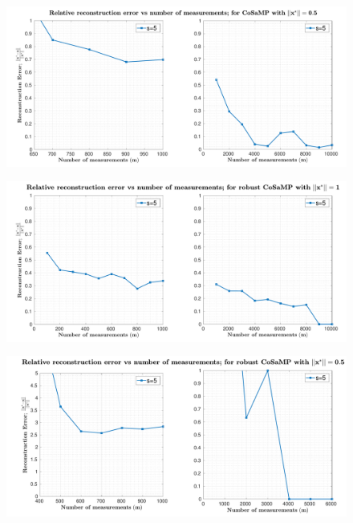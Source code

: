 \begin{figure}[t]
	\begin{center}
		\includegraphics[width=\linewidth]{./fig/plot-1-2.pdf}
	\end{center}
	\caption{}
	\label{fig:plot-1-2}
\end{figure}
%
\begin{figure}[t]
	\begin{center}
		\includegraphics[width=\linewidth]{./fig/plot-1-3.pdf}
	\end{center}
	\caption{}
	\label{fig:plot-1-3}
\end{figure}
%
\begin{figure}[t]
	\begin{center}
		\includegraphics[width=\linewidth]{./fig/plot-1-4.pdf}
	\end{center}
	\caption{}
	\label{fig:plot-1-4}
\end{figure}







